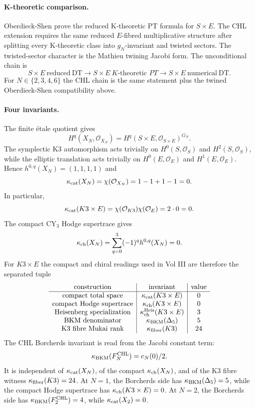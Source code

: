 \paragraph{K-theoretic comparison.}
Oberdieck-Shen prove the reduced K-theoretic PT formula for
$S\times E$. The CHL extension requires the same reduced
$E$-fibred multiplicative structure after splitting every K-theoretic
class into $g_N$-invariant and twisted sectors. The twisted-sector
character is the Mathieu twining Jacobi form. The unconditional chain is
\[
  S\times E\ \mathrm{reduced\ DT}
  \longrightarrow
  S\times E\ K\text{-theoretic }PT
  \longrightarrow
  S\times E\ \mathrm{numerical\ DT}.
\]
For $N\in\{2,3,4,6\}$ the CHL chain is the same statement plus the
twined Oberdieck-Shen compatibility above.

\paragraph{Four invariants.}
The finite \'etale quotient gives
\[
  H^q(X_N,\mathcal O_{X_N})
  =
  H^q(S\times E,\mathcal O_{S\times E})^{G_N}.
\]
The symplectic K3 automorphism acts trivially on
$H^0(S,\mathcal O_S)$ and $H^2(S,\mathcal O_S)$, while the elliptic
translation acts trivially on $H^0(E,\mathcal O_E)$ and
$H^1(E,\mathcal O_E)$. Hence $h^{0,q}(X_N)=(1,1,1,1)$ and
\[
  \kappa_{\mathrm{cat}}(X_N)=\chi(\mathcal O_{X_N})=1-1+1-1=0 .
\]
In particular,
\[
  \kappa_{\mathrm{cat}}(K3\times E)=\chi(\mathcal O_{K3})\chi(\mathcal O_E)=2\cdot0=0.
\]
The compact CY$_3$ Hodge supertrace gives
\[
  \kappa_{\mathrm{ch}}(X_N)=\sum_{q=0}^{3}(-1)^q h^{0,q}(X_N)=0 .
\]
For \(K3\times E\) the compact and chiral readings used in Vol III are
therefore the separated tuple
\[
\begin{array}{c|c|c}
\mathrm{construction}&\mathrm{invariant}&\mathrm{value}\\\hline
\mathrm{compact\ total\ space}&\kappa_{\mathrm{cat}}(K3\times E)&0\\
\mathrm{compact\ Hodge\ supertrace}&\kappa_{\mathrm{ch}}(K3\times E)&0\\
\mathrm{Heisenberg\ specialization}&\kappa_{\mathrm{ch}}^{\mathrm{Heis}}(K3\times E)&3\\
\mathrm{BKM\ denominator}&\kappa_{\mathrm{BKM}}(\Delta_5)&5\\
\mathrm{K3\ fibre\ Mukai\ rank}&\kappa_{\mathrm{fiber}}(K3)&24
\end{array}
\]
The CHL Borcherds invariant is read from the Jacobi constant term:
\[
  \kappa_{\mathrm{BKM}}(F^{\mathrm{CHL}}_N)=c_N(0)/2 .
\]
It is independent of \(\kappa_{\mathrm{cat}}(X_N)\), of the compact
\(\kappa_{\mathrm{ch}}(X_N)\), and of the K3 fibre witness \(\kappa_{\mathrm{fiber}}(K3)=24\). At
$N=1$, the Borcherds side has \(\kappa_{\mathrm{BKM}}(\Delta_5)=5\), while the compact
Hodge supertrace has \(\kappa_{\mathrm{ch}}(K3\times E)=0\). At $N=2$, the Borcherds
side has \(\kappa_{\mathrm{BKM}}(F^{\mathrm{CHL}}_2)=4\), while \(\kappa_{\mathrm{cat}}(X_2)=0\).

